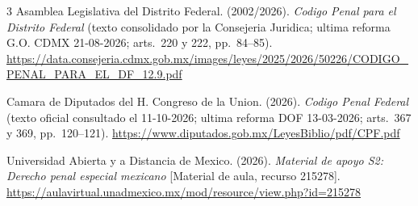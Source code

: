 \documentclass[spanish,letterpaper,oneside]{article}
\begin{document}
\clearpage
\begin{thebibliography}{3}
Asamblea Legislativa del Distrito Federal. (2002/2026). \emph{Codigo Penal
para el Distrito Federal} (texto consolidado por la Consejeria Juridica;
ultima reforma G.O. CDMX 21-08-2026; arts.~220 y 222, pp.~84--85).
\url{https://data.consejeria.cdmx.gob.mx/images/leyes/2025/2026/50226/CODIGO_PENAL_PARA_EL_DF_12.9.pdf}

Camara de Diputados del H. Congreso de la Union. (2026). \emph{Codigo
Penal Federal} (texto oficial consultado el 11-10-2026; ultima reforma
DOF 13-03-2026; arts.~367 y 369, pp.~120--121).
\url{https://www.diputados.gob.mx/LeyesBiblio/pdf/CPF.pdf}

Universidad Abierta y a Distancia de Mexico. (2026). \emph{Material de
apoyo S2: Derecho penal especial mexicano} {[}Material de aula, recurso
215278{]}.
\url{https://aulavirtual.unadmexico.mx/mod/resource/view.php?id=215278}
\end{thebibliography}
\end{document}
